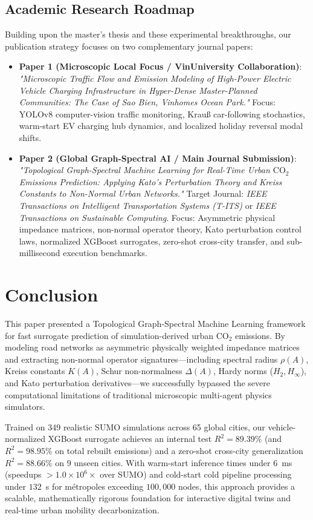 \documentclass[lettersize,journal]{IEEEtran}
\begin{document}
\subsection{Academic Research Roadmap}
Building upon the master's thesis and these experimental breakthroughs, our publication strategy focuses on two complementary journal papers:
\begin{itemize}
    \item \textbf{Paper 1 (Microscopic Local Focus / VinUniversity Collaboration)}: 
    \textit{"Microscopic Traffic Flow and Emission Modeling of High-Power Electric Vehicle Charging Infrastructure in Hyper-Dense Master-Planned Communities: The Case of Sao Bien, Vinhomes Ocean Park."}
    Focus: YOLOv8 computer-vision traffic monitoring, Krauß car-following stochastics, warm-start EV charging hub dynamics, and localized holiday reversal modal shifts.
    \item \textbf{Paper 2 (Global Graph-Spectral AI / Main Journal Submission)}: 
    \textit{"Topological Graph-Spectral Machine Learning for Real-Time Urban $\text{CO}_2$ Emissions Prediction: Applying Kato's Perturbation Theory and Kreiss Constants to Non-Normal Urban Networks."}
    Target Journal: \emph{IEEE Transactions on Intelligent Transportation Systems (T-ITS)} or \emph{IEEE Transactions on Sustainable Computing}. Focus: Asymmetric physical impedance matrices, non-normal operator theory, Kato perturbation control laws, normalized XGBoost surrogates, zero-shot cross-city transfer, and sub-millisecond execution benchmarks.
\end{itemize}

\section{Conclusion}
This paper presented a Topological Graph-Spectral Machine Learning framework for fast surrogate prediction of simulation-derived urban $\text{CO}_2$ emissions. By modeling road networks as asymmetric physically weighted impedance matrices and extracting non-normal operator signatures—including spectral radius $\rho(A)$, Kreiss constants $K(A)$, Schur non-normalness $\Delta(A)$, Hardy norms ($H_2, H_\infty$), and Kato perturbation derivatives—we successfully bypassed the severe computational limitations of traditional microscopic multi-agent physics simulators. 

Trained on 349 realistic SUMO simulations across 65 global cities, our vehicle-normalized XGBoost surrogate achieves an internal test $R^2 = 89.39\%$ (and $R^2 = 98.95\%$ on total rebuilt emissions) and a zero-shot cross-city generalization $R^2 = 88.66\%$ on 9 unseen cities. With warm-start inference times under $6$~ms (speedups $>1.0 \times 10^6 \times$ over SUMO) and cold-start cold pipeline processing under $132$~s for métropoles exceeding $100,000$ nodes, this approach provides a scalable, mathematically rigorous foundation for interactive digital twins and real-time urban mobility decarbonization.
\end{document}
